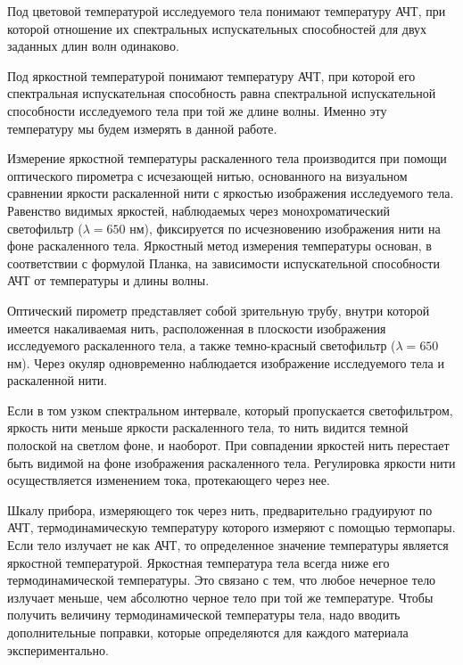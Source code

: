 \documentclass[a4paper,12pt]{article}
\begin{document}
Под цветовой температурой исследуемого тела понимают температуру АЧТ, при которой отношение их спектральных испускательных способностей для двух заданных длин волн одинаково.

Под яркостной температурой понимают температуру АЧТ, при которой его спектральная испускательная способность равна спектральной испускательной способности исследуемого тела при той же длине волны. Именно эту температуру мы будем измерять в данной работе.

Измерение яркостной температуры раскаленного тела производится при помощи оптического пирометра с исчезающей нитью, основанного на визуальном сравнении яркости раскаленной нити с яркостью изображения исследуемого тела. Равенство видимых яркостей, наблюдаемых через монохроматический светофильтр ($\lambda = 650$ нм), фиксируется по исчезновению изображения нити на фоне раскаленного тела. Яркостный метод измерения температуры основан, в соответствии с формулой Планка, на зависимости испускательной способности АЧТ от температуры и длины волны.

Оптический пирометр представляет собой зрительную трубу, внутри которой имеется накаливаемая нить, расположенная в плоскости изображения исследуемого раскаленного тела, а также темно-красный светофильтр ($\lambda = 650$ нм). Через окуляр одновременно наблюдается изображение исследуемого тела и раскаленной нити.

Если в том узком спектральном интервале, который пропускается светофильтром, яркость нити меньше яркости раскаленного тела, то нить видится темной полоской на светлом фоне, и наоборот. При совпадении яркостей нить перестает быть видимой на фоне изображения раскаленного тела. Регулировка яркости нити осуществляется изменением тока, протекающего через нее.

Шкалу прибора, измеряющего ток через нить, предварительно градуируют по АЧТ, термодинамическую температуру которого измеряют с помощью термопары. Если тело излучает не как АЧТ, то определенное значение температуры является яркостной температурой. Яркостная температура тела всегда ниже его термодинамической температуры. Это связано с тем, что любое нечерное тело излучает меньше, чем абсолютно черное тело при той же температуре. Чтобы получить величину термодинамической температуры тела, надо вводить дополнительные поправки, которые определяются для каждого материала экспериментально.
\end{document}
